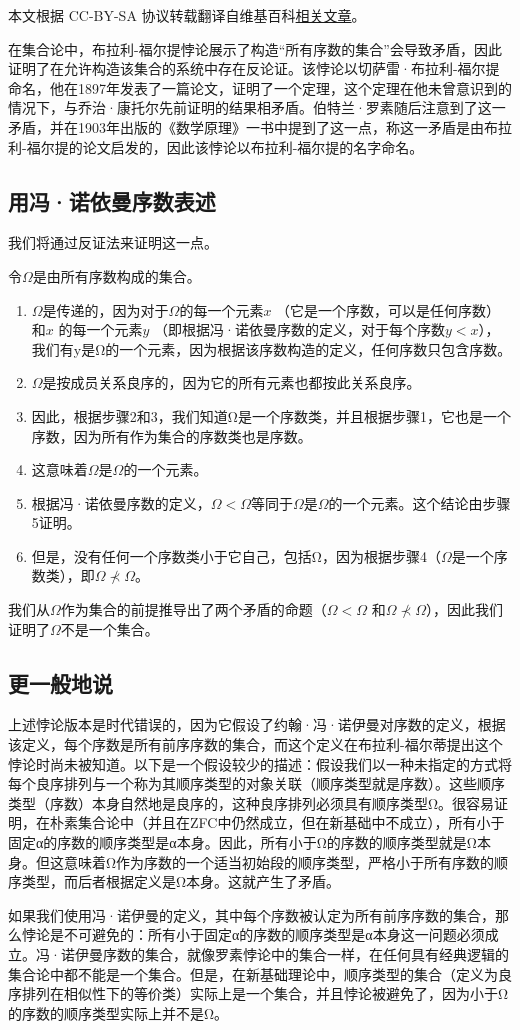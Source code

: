 
本文根据 CC-BY-SA 协议转载翻译自维基百科\href{https://en.wikipedia.org/wiki/Burali-Forti_paradox}{相关文章}。

在集合论中，布拉利-福尔提悖论展示了构造“所有序数的集合”会导致矛盾，因此证明了在允许构造该集合的系统中存在反论证。该悖论以切萨雷·布拉利-福尔提命名，他在1897年发表了一篇论文，证明了一个定理，这个定理在他未曾意识到的情况下，与乔治·康托尔先前证明的结果相矛盾。伯特兰·罗素随后注意到了这一矛盾，并在1903年出版的《数学原理》一书中提到了这一点，称这一矛盾是由布拉利-福尔提的论文启发的，因此该悖论以布拉利-福尔提的名字命名。
\subsection{用冯·诺依曼序数表述}
我们将通过反证法来证明这一点。

令$\Omega$是由所有序数构成的集合。
\begin{enumerate}
\item $\Omega$是传递的，因为对于$\Omega$的每一个元素$x$ （它是一个序数，可以是任何序数）和$x$ 的每一个元素$y$ （即根据冯·诺依曼序数的定义，对于每个序数$y < x$），我们有y是Ω的一个元素，因为根据该序数构造的定义，任何序数只包含序数。
\item $\Omega$是按成员关系良序的，因为它的所有元素也都按此关系良序。
\item 因此，根据步骤2和3，我们知道Ω是一个序数类，并且根据步骤1，它也是一个序数，因为所有作为集合的序数类也是序数。
\item 这意味着$\Omega$是$\Omega$的一个元素。
\item 根据冯·诺依曼序数的定义，$\Omega< \Omega$等同于$\Omega$是$\Omega$的一个元素。这个结论由步骤5证明。
\item 但是，没有任何一个序数类小于它自己，包括Ω，因为根据步骤4（$\Omega$是一个序数类），即$\Omega \not\prec \Omega$。
\end{enumerate}
我们从$\Omega$作为集合的前提推导出了两个矛盾的命题（$\Omega< \Omega$ 和$\Omega \not\prec \Omega$），因此我们证明了$\Omega$不是一个集合。
\subsection{更一般地说}
上述悖论版本是时代错误的，因为它假设了约翰·冯·诺伊曼对序数的定义，根据该定义，每个序数是所有前序序数的集合，而这个定义在布拉利-福尔蒂提出这个悖论时尚未被知道。以下是一个假设较少的描述：假设我们以一种未指定的方式将每个良序排列与一个称为其顺序类型的对象关联（顺序类型就是序数）。这些顺序类型（序数）本身自然地是良序的，这种良序排列必须具有顺序类型Ω。很容易证明，在朴素集合论中（并且在ZFC中仍然成立，但在新基础中不成立），所有小于固定α的序数的顺序类型是α本身。因此，所有小于Ω的序数的顺序类型就是Ω本身。但这意味着Ω作为序数的一个适当初始段的顺序类型，严格小于所有序数的顺序类型，而后者根据定义是Ω本身。这就产生了矛盾。

如果我们使用冯·诺伊曼的定义，其中每个序数被认定为所有前序序数的集合，那么悖论是不可避免的：所有小于固定α的序数的顺序类型是α本身这一问题必须成立。冯·诺伊曼序数的集合，就像罗素悖论中的集合一样，在任何具有经典逻辑的集合论中都不能是一个集合。但是，在新基础理论中，顺序类型的集合（定义为良序排列在相似性下的等价类）实际上是一个集合，并且悖论被避免了，因为小于Ω的序数的顺序类型实际上并不是Ω。


